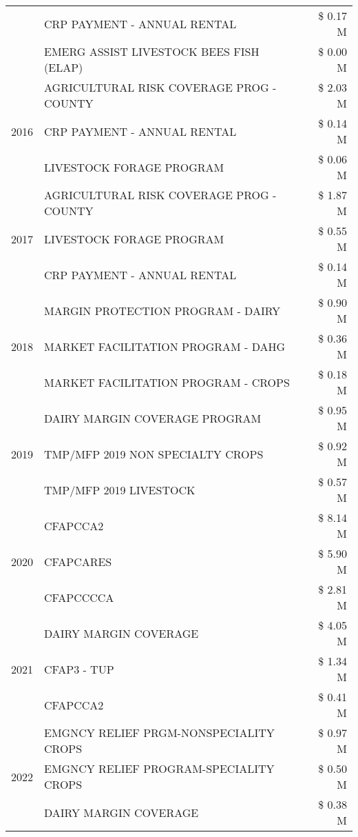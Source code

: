 \begin{tabular}{llr}
 & CRP PAYMENT - ANNUAL RENTAL & \$ 0.17 M \\
 & EMERG ASSIST LIVESTOCK BEES FISH (ELAP) & \$ 0.00 M \\
\cline{1-3}
\multirow[t]{3}{*}{2016} & AGRICULTURAL RISK COVERAGE PROG - COUNTY & \$ 2.03 M \\
 & CRP PAYMENT - ANNUAL RENTAL & \$ 0.14 M \\
 & LIVESTOCK FORAGE PROGRAM & \$ 0.06 M \\
\cline{1-3}
\multirow[t]{3}{*}{2017} & AGRICULTURAL RISK COVERAGE PROG - COUNTY & \$ 1.87 M \\
 & LIVESTOCK FORAGE PROGRAM & \$ 0.55 M \\
 & CRP PAYMENT - ANNUAL RENTAL & \$ 0.14 M \\
\cline{1-3}
\multirow[t]{3}{*}{2018} & MARGIN PROTECTION PROGRAM - DAIRY & \$ 0.90 M \\
 & MARKET FACILITATION PROGRAM - DAHG & \$ 0.36 M \\
 & MARKET FACILITATION PROGRAM - CROPS & \$ 0.18 M \\
\cline{1-3}
\multirow[t]{3}{*}{2019} & DAIRY MARGIN COVERAGE PROGRAM & \$ 0.95 M \\
 & TMP/MFP 2019 NON SPECIALTY CROPS & \$ 0.92 M \\
 & TMP/MFP 2019 LIVESTOCK & \$ 0.57 M \\
\cline{1-3}
\multirow[t]{3}{*}{2020} & CFAPCCA2 & \$ 8.14 M \\
 & CFAPCARES & \$ 5.90 M \\
 & CFAPCCCCA & \$ 2.81 M \\
\cline{1-3}
\multirow[t]{3}{*}{2021} & DAIRY MARGIN COVERAGE & \$ 4.05 M \\
 & CFAP3 - TUP & \$ 1.34 M \\
 & CFAPCCA2 & \$ 0.41 M \\
\cline{1-3}
\multirow[t]{3}{*}{2022} & EMGNCY RELIEF PRGM-NONSPECIALITY CROPS & \$ 0.97 M \\
 & EMGNCY RELIEF PROGRAM-SPECIALITY CROPS & \$ 0.50 M \\
 & DAIRY MARGIN COVERAGE & \$ 0.38 M \\
\cline{1-3}
\bottomrule
\end{tabular}
